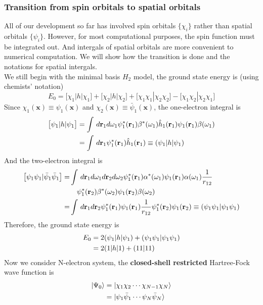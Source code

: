 \documentclass[11pt]{article}
\begin{document}
\subsubsection{Transition from spin orbitals to spatial orbitals}
All of our development so far has involved spin orbitals $\{\chi_i\}$ rather than spatial orbitals $\{\psi_i\}$. However, for most computational purposes, the
spin function must be integrated out. And intergals of spatial orbitals are more convenient to numerical computation. We will show how the transition is done
and the notations for spatial intergals.\\
We still begin with the minimal basis $H_2$ model, the ground state energy is (using chemists' notation)
\begin{equation}
    E_0=\big[\chi_1|h|\chi_1\big]+\big[\chi_2|h|\chi_2\big]+\big[\chi_1\chi_1|\chi_2\chi_2\big]-\big[\chi_1\chi_2|\chi_2\chi_1\big]
\end{equation}
Since $\chi_1(\mathbf{x})\equiv\psi_1(\mathbf{x})$ and $\chi_2(\mathbf{x})\equiv\bar{\psi}_1(\mathbf{x})$, the one-electron integral is
\begin{align}
    \big[\psi_1|h|\psi_1\big]&=\int\,d\mathbf{r}_1 d\omega_1 \psi_1^*(\mathbf{r}_1)\beta^*(\omega_1)\Hat{h}_1(\mathbf{r}_1)\psi_1(\mathbf{r}_1)\beta(\omega_1)\notag\\
    &=\int\,d\mathbf{r}_1\psi_1^*(\mathbf{r}_1)\Hat{h}_1(\mathbf{r}_1)\equiv(\psi_1|h|\psi_1)
\end{align}
And the two-electron integral is
\begin{align}
    \big[\psi_1\psi_1|\bar{\psi}_1\bar{\psi}_1\big]=&\int\,d\mathbf{r}_1 d\omega_1 d\mathbf{r}_2 d\omega_2 \psi_1^*(\mathbf{r}_1)\alpha^*(\omega_1)\psi_1(\mathbf{r}_1)\alpha(\omega_1)\frac{1}{r_{12}}\notag \\
    &\quad \psi_1^*(\mathbf{r}_2)\beta^*(\omega_2)\psi_1(\mathbf{r}_2)\beta(\omega_2)\notag\\
    =&\int\,d\mathbf{r}_1 d\mathbf{r}_2 \psi_1^*(\mathbf{r}_1)\psi_1(\mathbf{r}_1)\frac{1}{r_{12}}\psi_1^*(\mathbf{r}_2)\psi_1(\mathbf{r}_2)\equiv(\psi_1\psi_1|\psi_1\psi_1)
\end{align}
Therefore, the ground state energy is
\begin{align}
    E_0&=2(\psi_1|h|\psi_1)+(\psi_1\psi_1|\psi_1\psi_1)\notag\\
    &=2(1|h|1)+(11|11)
\end{align}
Now we consider N-electron system, the \textbf{closed-shell restricted} Hartree-Fock wave function is
\begin{equation}
    \begin{split}
        \ket{\Psi_0}&=\ket{\chi_1\chi_2\cdots\chi_{N-1}\chi_N}\\
        &=\ket{\psi_1\bar{\psi}_1\cdots\psi_N\bar{\psi}_N}
    \end{split}
\end{equation} 
\end{document}
